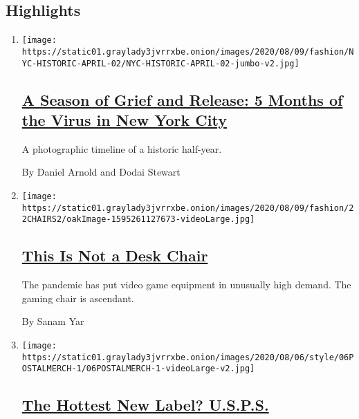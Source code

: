 \hypertarget{highlights}{%
\subsection{Highlights}\label{highlights}}

\begin{enumerate}
\def\labelenumi{\arabic{enumi}.}
\item
  \texttt{[image: https://static01.graylady3jvrrxbe.onion/images/2020/08/09/fashion/NYC-HISTORIC-APRIL-02/NYC-HISTORIC-APRIL-02-jumbo-v2.jpg]}

  \hypertarget{a-season-of-grief-and-release-5-months-of-the-virus-in-new-york-city}{%
  \subsection{\texorpdfstring{\href{/2020/08/07/style/coronavirus-nyc-historic-season.html}{A
  Season of Grief and Release: 5 Months of the Virus in New York
  City}}{A Season of Grief and Release: 5 Months of the Virus in New York City}}\label{a-season-of-grief-and-release-5-months-of-the-virus-in-new-york-city}}

  A photographic timeline of a historic half-year.

  By Daniel Arnold and Dodai Stewart
\item
  \texttt{[image: https://static01.graylady3jvrrxbe.onion/images/2020/08/09/fashion/22CHAIRS2/oakImage-1595261127673-videoLarge.jpg]}

  \hypertarget{this-is-not-a-desk-chair}{%
  \subsection{\texorpdfstring{\href{/2020/08/07/style/gamer-chair-market-herman-miller.html}{This
  Is Not a Desk
  Chair}}{This Is Not a Desk Chair}}\label{this-is-not-a-desk-chair}}

  The pandemic has put video game equipment in unusually high demand.
  The gaming chair is ascendant.

  By Sanam Yar
\item
  \texttt{[image: https://static01.graylady3jvrrxbe.onion/images/2020/08/06/style/06POSTALMERCH-1/06POSTALMERCH-1-videoLarge-v2.jpg]}

  \hypertarget{the-hottest-new-label-usps}{%
  \subsection{\texorpdfstring{\href{/2020/08/06/style/usps-store.html}{The
  Hottest New Label?
  U.S.P.S.}}{The Hottest New Label? U.S.P.S.}}\label{the-hottest-new-label-usps}}


\end{enumerate}
